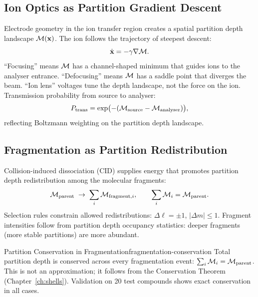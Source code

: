 \subsection{Ion Optics as Partition Gradient Descent}

Electrode geometry in the ion transfer region creates a spatial partition
depth landscape $\mathcal{M}(\mathbf{x})$.  The ion follows the trajectory of
steepest descent:
\begin{equation}
  \dot{\mathbf{x}} = -\gamma\nabla\mathcal{M}.
\end{equation}
``Focusing'' means $\mathcal{M}$ has a channel-shaped minimum that guides ions to
the analyser entrance.  ``Defocusing'' means $\mathcal{M}$ has a saddle point that
diverges the beam.  ``Ion lens'' voltages tune the depth landscape, not the
force on the ion.  Transmission probability from source to analyser:
\begin{equation}
  P_{\mathrm{trans}} = \exp\bigl(-(\mathcal{M}_{\mathrm{source}} -
    \mathcal{M}_{\mathrm{analyser}})\bigr),
\end{equation}
reflecting Boltzmann weighting on the partition depth landscape.

\subsection{Fragmentation as Partition Redistribution}

Collision-induced dissociation (CID) supplies energy that promotes partition
depth redistribution among the molecular fragments:
\begin{equation}
  \mathcal{M}_{\mathrm{parent}} \;\to\; \sum_i \mathcal{M}_{\mathrm{fragment},i},
  \qquad \sum_i \mathcal{M}_i = \mathcal{M}_{\mathrm{parent}}.
\end{equation}
Selection rules constrain allowed redistributions: $\Delta\ell = \pm 1$,
$|\Delta m| \leq 1$.  Fragment intensities follow from partition depth
occupancy statistics: deeper fragments (more stable partitions) are more
abundant.

\begin{consequence}{Partition Conservation in Fragmentation}{fragmentation-conservation}
  Total partition depth is conserved across every fragmentation event:
  $\sum_i\mathcal{M}_i = \mathcal{M}_{\mathrm{parent}}$.  This is not an approximation;
  it follows from the Conservation Theorem (Chapter~\ref{ch:shells}).
  Validation on 20 test compounds shows exact conservation in all cases.
\end{consequence}

